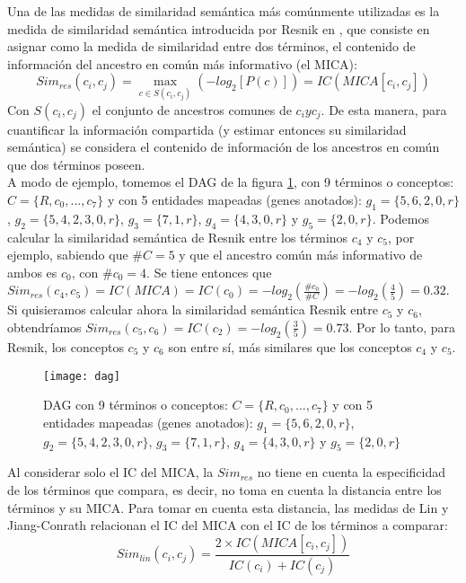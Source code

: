 Una de las medidas de similaridad semántica más comúnmente utilizadas es la medida de similaridad semántica introducida por Resnik en \cite{Resnik1995}, que consiste en asignar como la medida de similaridad entre dos términos, el contenido de información del ancestro en común más informativo (el MICA):
\begin{equation}
	Sim_{res}(c_i, c_j) = \max\limits_{c \in S(c_i, c_j)}(-log_2[P(c)]) = IC(MICA[c_i, c_j])
\end{equation}
Con $S(c_i, c_j)$ el conjunto de ancestros comunes de $c_i y c_j$. De esta manera, para cuantificar la información compartida (y estimar entonces su similaridad semántica) se considera el contenido de información de los ancestros en común que dos términos poseen.\\
A modo de ejemplo, tomemos el DAG de la figura \ref{fig:dag}, con 9 términos o conceptos: $C=\{R, c_0,...,c_7\}$ y con 5 entidades mapeadas (genes anotados): $g_1=\{5, 6, 2, 0, r\}$, $g_2=\{5, 4, 2, 3, 0, r\}$, $g_3=\{7, 1, r\}$, $g_4=\{4, 3, 0, r\}$ y $g_5=\{2, 0, r\}$. Podemos calcular la similaridad semántica de Resnik entre los términos $c_4$ y $c_5$, por ejemplo, sabiendo que $\#C = 5$ y que el ancestro común más informativo de ambos es $c_0$, con $\#c_0=4$. Se tiene entonces que $Sim_{res}(c_4, c_5) = IC(MICA) = IC(c_0) = -log_2(\frac{\#c_0}{\#C}) = -log_2(\frac{4}{5}) = 0.32$. Si quisieramos calcular ahora la similaridad semántica Resnik entre $c_5$ y $c_6$, obtendríamos $Sim_{res}(c_5, c_6) = IC(c_2) = -log_2(\frac{3}{5}) = 0.73$. Por lo tanto, para Resnik, los conceptos $c_5$ y $c_6$ son entre sí, más similares que los conceptos $c_4$ y $c_5$.\\
\begin{figure}[h]
    \centering
    \texttt{[image: dag]}
    \caption{DAG con 9 términos o conceptos: $C=\{R, c_0,...,c_7\}$ y con 5 entidades mapeadas (genes anotados): $g_1=\{5, 6, 2, 0, r\}$, $g_2=\{5, 4, 2, 3, 0, r\}$, $g_3=\{7, 1, r\}$, $g_4=\{4, 3, 0, r\}$ y $g_5=\{2, 0, r\}$}
    \label{fig:dag}
\end{figure}
Al considerar solo el IC del MICA, la $Sim_{res}$ no tiene en cuenta la especificidad de los términos que compara, es decir, no toma en cuenta la distancia entre los términos y su MICA. Para tomar en cuenta esta distancia, las medidas de Lin \cite{Lin1998} y Jiang-Conrath \cite{Jiang1997} relacionan el IC del MICA con el IC de los términos a comparar:
\begin{equation}
	Sim_{lin}(c_i, c_j) = \frac{2\times IC(MICA[c_i, c_j])}{IC(c_i)+IC(c_j)}
\end{equation}
